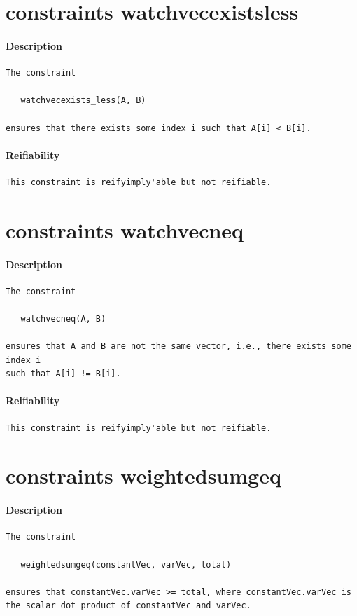 \documentclass[oneside]{book}
\begin{document}
\section{constraints watchvecexists\textunderscore less}
\paragraph{Description}
{\footnotesize
\begin{verbatim}
The constraint

   watchvecexists_less(A, B)

ensures that there exists some index i such that A[i] < B[i].
\end{verbatim}
}
\paragraph{Reifiability}
{\footnotesize
\begin{verbatim}
This constraint is reifyimply'able but not reifiable.
\end{verbatim}
}
\section{constraints watchvecneq}
\paragraph{Description}
{\footnotesize
\begin{verbatim}
The constraint

   watchvecneq(A, B)

ensures that A and B are not the same vector, i.e., there exists some index i
such that A[i] != B[i].
\end{verbatim}
}
\paragraph{Reifiability}
{\footnotesize
\begin{verbatim}
This constraint is reifyimply'able but not reifiable.
\end{verbatim}
}
\section{constraints weightedsumgeq}
\paragraph{Description}
{\footnotesize
\begin{verbatim}
The constraint

   weightedsumgeq(constantVec, varVec, total)

ensures that constantVec.varVec >= total, where constantVec.varVec is
the scalar dot product of constantVec and varVec.
\end{verbatim}
}
\end{document}
